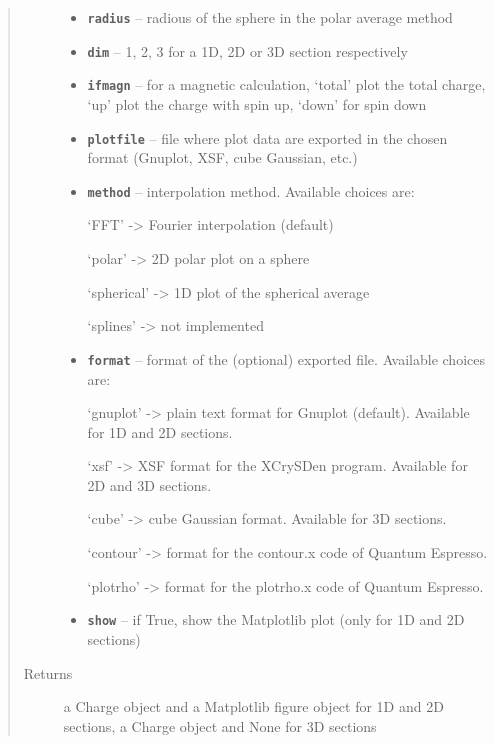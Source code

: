 \documentclass[letterpaper,10pt,english]{sphinxmanual}
\begin{document}
\begin{fulllineitems}
\begin{quote}
\begin{description}
\begin{itemize}
\item {} 
\textbf{\texttt{radius}} -- radious of the sphere in the polar average method

\item {} 
\textbf{\texttt{dim}} -- 1, 2, 3 for a 1D, 2D or 3D section respectively

\item {} 
\textbf{\texttt{ifmagn}} -- for a magnetic calculation, `total' plot the total charge, `up' plot the charge with spin up,
`down' for spin down

\item {} 
\textbf{\texttt{plotfile}} -- file where plot data are exported in the chosen format (Gnuplot, XSF, cube Gaussian, etc.)

\item {} 
\textbf{\texttt{method}} -- 
interpolation method. Available choices are:

`FFT' -\textgreater{} Fourier interpolation (default)

`polar' -\textgreater{} 2D polar plot on a sphere

`spherical' -\textgreater{} 1D plot of the spherical average

`splines' -\textgreater{} not implemented


\item {} 
\textbf{\texttt{format}} -- 
format of the (optional) exported file. Available choices are:

`gnuplot' -\textgreater{} plain text format for Gnuplot (default). Available for 1D and 2D sections.

`xsf' -\textgreater{} XSF format for the XCrySDen program. Available for 2D and 3D sections.

`cube' -\textgreater{} cube Gaussian format. Available for 3D sections.

`contour' -\textgreater{} format for the contour.x code of Quantum Espresso.

`plotrho' -\textgreater{} format for the plotrho.x code of Quantum Espresso.


\item {} 
\textbf{\texttt{show}} -- if True, show the Matplotlib plot (only for 1D and 2D sections)

\end{itemize}

\item[{Returns}] \leavevmode
a Charge object and a Matplotlib figure object for 1D and 2D sections,
a Charge object and None for 3D sections

\end{description}\end{quote}

\end{fulllineitems}
\end{document}

